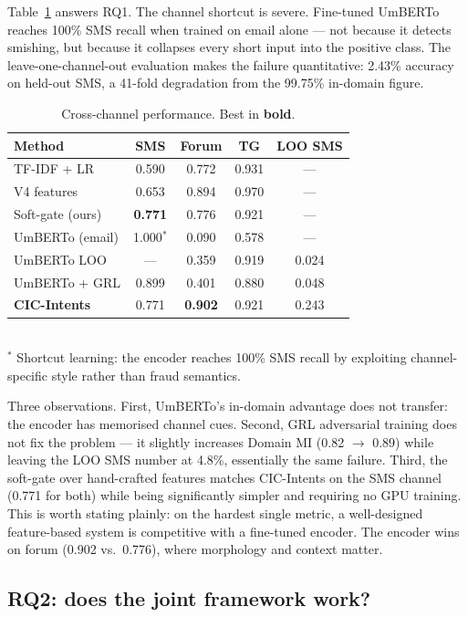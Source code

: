 \documentclass[preprint,12pt,authoryear]{elsarticle}
\begin{document}
Table~\ref{tab:main} answers RQ1. The channel shortcut is severe.
Fine-tuned UmBERTo reaches 100\% SMS recall when trained on email
alone --- not because it detects smishing, but because it collapses
every short input into the positive class. The leave-one-channel-out
evaluation makes the failure quantitative: 2.43\% accuracy on
held-out SMS, a 41-fold degradation from the 99.75\% in-domain
figure.

\begin{table}[t]
\centering
\caption{Cross-channel performance. Best in \textbf{bold}.}
\label{tab:main}
\begin{tabular}{lcccc}
\toprule
\textbf{Method} & \textbf{SMS} & \textbf{Forum} & \textbf{TG} & \textbf{LOO SMS} \\
\midrule
TF-IDF + LR       & 0.590 & 0.772 & 0.931 & --- \\
V4 features       & 0.653 & 0.894 & 0.970 & --- \\
Soft-gate (ours)  & \textbf{0.771} & 0.776 & 0.921 & --- \\
UmBERTo (email)   & 1.000$^\ast$ & 0.090 & 0.578 & --- \\
UmBERTo LOO       & ---   & 0.359 & 0.919 & 0.024 \\
UmBERTo + GRL     & 0.899 & 0.401 & 0.880 & 0.048 \\
\textbf{CIC-Intents} & 0.771 & \textbf{0.902} & 0.921 & 0.243 \\
\bottomrule
\end{tabular}
\\[2pt]
\footnotesize $^\ast$ Shortcut learning: the encoder reaches
100\% SMS recall by exploiting channel-specific style rather than
fraud semantics.
\end{table}

Three observations. First, UmBERTo's in-domain advantage does not
transfer: the encoder has memorised channel cues. Second, GRL
adversarial training does not fix the problem --- it slightly
increases Domain MI (0.82 $\to$ 0.89) while leaving the LOO SMS
number at 4.8\%, essentially the same failure. Third, the soft-gate
over hand-crafted features matches CIC-Intents on the SMS channel
(0.771 for both) while being significantly simpler and requiring no
GPU training. This is worth stating plainly: on the hardest single
metric, a well-designed feature-based system is competitive with a
fine-tuned encoder. The encoder wins on forum (0.902 vs.\ 0.776),
where morphology and context matter.

\subsection{RQ2: does the joint framework work?}
\label{sec:rq2}
\end{document}
